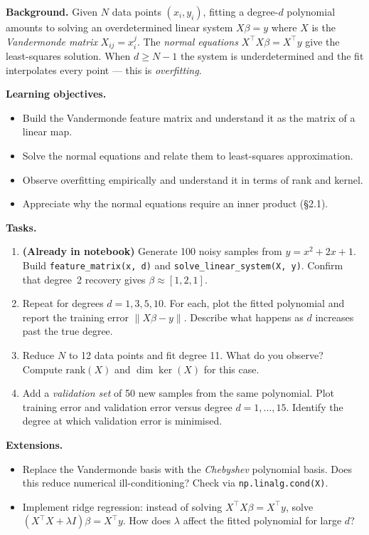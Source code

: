 \documentclass[11pt, a4paper]{article}
\newcommand{\objectives}[1]{%
  \textbf{\color{prereqcolor}Learning objectives.}\vspace{2pt}
  \begin{itemize}[leftmargin=1.6em, itemsep=1pt] #1 \end{itemize}
}
\newcommand{\tasks}[1]{%
  \begin{taskbox}
  \textbf{\color{taskcolor}Tasks.}
  \begin{enumerate}[leftmargin=1.6em, itemsep=3pt] #1 \end{enumerate}
  \end{taskbox}
}
\newcommand{\extensions}[1]{%
  \textbf{\color{notecolor}Extensions.}
  \begin{itemize}[leftmargin=1.6em, itemsep=1pt] #1 \end{itemize}
}
\begin{document}
\noindent\textbf{Background.}
Given $N$ data points $(x_i, y_i)$, fitting a degree-$d$ polynomial amounts to
solving an overdetermined linear system $X\beta = y$ where $X$ is the
\emph{Vandermonde matrix} $X_{ij} = x_i^j$.  The \emph{normal equations}
$X^\top X \beta = X^\top y$ give the least-squares solution.
When $d \geq N - 1$ the system is underdetermined and the fit interpolates
every point — this is \emph{overfitting}.

\objectives{
  \item Build the Vandermonde feature matrix and understand it as the matrix of a linear map.
  \item Solve the normal equations and relate them to least-squares approximation.
  \item Observe overfitting empirically and understand it in terms of rank and kernel.
  \item Appreciate why the normal equations require an inner product (§2.1).
}

\tasks{
  \item \textbf{(Already in notebook)} Generate 100 noisy samples from
        $y = x^2 + 2x + 1$.  Build \texttt{feature\_matrix(x, d)} and
        \texttt{solve\_linear\_system(X, y)}.  Confirm that degree~2 recovery
        gives $\beta \approx [1, 2, 1]$.
  \item Repeat for degrees $d = 1, 3, 5, 10$.  For each, plot the fitted
        polynomial and report the training error $\|X\beta - y\|$.
        Describe what happens as $d$ increases past the true degree.
  \item Reduce $N$ to 12 data points and fit degree 11.  What do you observe?
        Compute $\mathrm{rank}(X)$ and $\dim\ker(X)$ for this case.
  \item Add a \emph{validation set} of 50 new samples from the same polynomial.
        Plot training error and validation error versus degree $d = 1, \ldots, 15$.
        Identify the degree at which validation error is minimised.
}

\extensions{
  \item Replace the Vandermonde basis with the \emph{Chebyshev} polynomial basis.
        Does this reduce numerical ill-conditioning? Check via \texttt{np.linalg.cond(X)}.
  \item Implement ridge regression: instead of solving $X^\top X \beta = X^\top y$,
        solve $(X^\top X + \lambda I)\beta = X^\top y$. How does $\lambda$ affect the
        fitted polynomial for large $d$?
}
\end{document}
